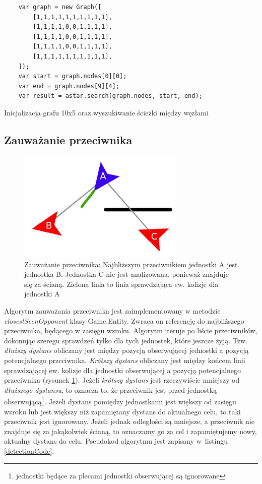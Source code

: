 \begin{table}
\begin{center}
\begin{lstlisting}
	var graph = new Graph([
		[1,1,1,1,1,1,1,1,1,1],
		[1,1,1,1,0,0,1,1,1,1],
		[1,1,1,1,0,0,1,1,1,1],
		[1,1,1,1,0,0,1,1,1,1],
		[1,1,1,1,1,1,1,1,1,1],
	]);
	var start = graph.nodes[0][0];
	var end = graph.nodes[9][4];
	var result = astar.search(graph.nodes, start, end);
 \end{lstlisting}
\caption {Inicjalizacja grafu 10x5 oraz wyszukiwanie ścieżki między węzłami}
\label{astarCode}
\end{center}
\end{table}

\subsection{Zauważanie przeciwnika}\label{detectionSubsection}

\begin{figure}
\begin{center}
	\includegraphics[width=80mm,height=53mm]{images/detection}
	\caption[Zauważanie przeciwnika]{Zauważanie przeciwnika: Najbliższym przeciwnikiem jednostki A jest jednostka B. Jednostka C nie jest analizowana, ponieważ znajduje się za ścianą. Zielona linia to linia sprawdzająca ew. kolizje dla jednostki A\label{detectionImage}}
\end{center}
\end{figure}

Algorytm zauważania przeciwnika jest zaimplementowany w metodzie \emph{closestSeenOpponent} klasy Game.Entity. Zwraca on referencję do najbliższego przeciwnika, będącego w zasięgu wzroku. Algorytm iteruje po liście przeciwników, dokonując szeregu sprawdzeń tylko dla tych jednostek, które jeszcze żyją. Tzw. \emph{dłuższy dystans} obliczany jest między pozycją obserwującej jednostki a pozycją potencjalnego przeciwnika. \emph{Krótszy dystans} obliczany jest między końcem linii sprawdzającej ew. kolizje dla jednostki obserwującej a pozycją potencjalnego przeciwnika (rysunek \ref{detectionImage}). Jeżeli \emph{krótszy dystans} jest rzeczywiście mniejszy od \emph{dłuższego dystansu}, to oznacza to, że przeciwnik jest przed jednostką obserwującą\footnote{jednostki będące za plecami jednostki obserwującej są ignorowane}. Jeżeli dystans pomiędzy jednostkami jest większy od zasięgu wzroku lub jest większy niż zapamiętany dystans do aktualnego celu, to taki przeciwnik jest ignorowany. Jeżeli jednak odległości są mniejsze, a przeciwnik nie znajduje się za jakąkolwiek ścianą, to oznaczamy go za cel i zapamiętujemy nowy, aktualny dystans do celu. Pseudokod algorytmu jest zapisany w~listingu \ref{detectionCode}.

